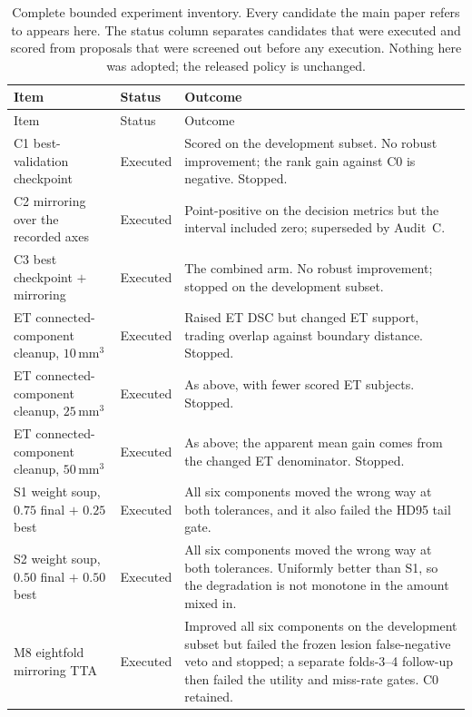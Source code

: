 \documentclass[runningheads]{llncs}
\begin{document}
{\small
\begin{longtable}{@{}>{\raggedright\arraybackslash}p{}>{\raggedright\arraybackslash}p{}>{\raggedright\arraybackslash}p{}@{}}
\caption{Complete bounded experiment inventory. Every candidate the main paper refers to appears here. The status column separates candidates that were executed and scored from proposals that were screened out before any execution. Nothing here was adopted; the released policy is unchanged.}\\
\toprule
Item & Status & Outcome \\
\midrule
\endfirsthead
\toprule
Item & Status & Outcome \\
\midrule
\endhead
\bottomrule
\endfoot
C1 best-validation checkpoint & Executed & Scored on the development subset. No robust improvement; the rank gain against C0 is negative. Stopped. \\
\addlinespace[2pt]
C2 mirroring over the recorded axes & Executed & Point-positive on the decision metrics but the interval included zero; superseded by Audit~C. \\
\addlinespace[2pt]
C3 best checkpoint $+$ mirroring & Executed & The combined arm. No robust improvement; stopped on the development subset. \\
\addlinespace[2pt]
ET connected-component cleanup, $10$\,mm$^3$ & Executed & Raised ET DSC but changed ET support, trading overlap against boundary distance. Stopped. \\
\addlinespace[2pt]
ET connected-component cleanup, $25$\,mm$^3$ & Executed & As above, with fewer scored ET subjects. Stopped. \\
\addlinespace[2pt]
ET connected-component cleanup, $50$\,mm$^3$ & Executed & As above; the apparent mean gain comes from the changed ET denominator. Stopped. \\
\addlinespace[2pt]
S1 weight soup, $0.75$ final $+$ $0.25$ best & Executed & All six components moved the wrong way at both tolerances, and it also failed the HD95 tail gate. \\
\addlinespace[2pt]
S2 weight soup, $0.50$ final $+$ $0.50$ best & Executed & All six components moved the wrong way at both tolerances. Uniformly better than S1, so the degradation is not monotone in the amount mixed in. \\
\addlinespace[2pt]
M8 eightfold mirroring TTA & Executed & Improved all six components on the development subset but failed the frozen lesion false-negative veto and stopped; a separate folds-3--4 follow-up then failed the utility and miss-rate gates. C0 retained. \\

\end{longtable}}
\end{document}
